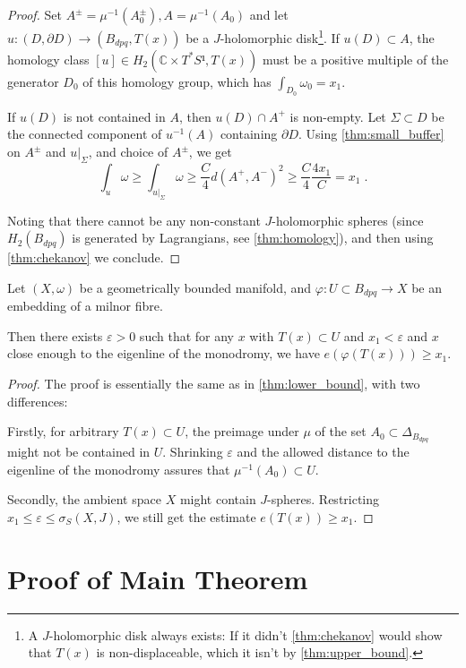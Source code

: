 \documentclass[12pt,a4paper,draft]{scrartcl}
\begin{document}
\begin{proof}
  Set $A^± = μ^{-1}(A_0^±), A = μ^{-1}(A_0)$ and let $u\colon (D,∂D) → (B_{dpq}, T(x))$ be a $J$-holomorphic disk\footnote{A $J$-holomorphic disk always exists: If it didn't \cref{thm:chekanov} would show that $T(x)$ is non-displaceable, which it isn't by \cref{thm:upper_bound}.}. If $u(D) ⊂ A$, the homology class $[u] ∈ H_2(ℂ × T^*S¹, T(x))$ must be a positive multiple of the generator $D_0$ of this homology group, which has $∫_{D_0} ω_0 = x_1$.
  
  If $u(D)$ is not contained in $A$, then $u(D) ∩ A^+$ is non-empty. Let $Σ ⊂ D$ be the connected component of $u^{-1}(A)$ containing $∂D$. Using \cref{thm:small_buffer} on $A^±$ and $u|_Σ$, and choice of $A^±$, we get
  \[∫_u ω ≥ ∫_{u|_Σ} ω ≥ \frac{C}{4} d(A^+,A^-)^2 ≥ \frac{C}{4} \frac{4x_1}{C} = x_1 \;. \]

  Noting that there cannot be any non-constant $J$-holomorphic spheres (since $H_2(B_{dpq})$ is generated by Lagrangians, see \cref{thm:homology}), and then using \cref{thm:chekanov} we conclude.
\end{proof}

\begin{proposition}
  \label{thm:embedded_lower_bound}
  Let $(X,ω)$ be a geometrically bounded manifold, and $φ \colon U ⊂ B_{dpq} → X$ be an embedding of a milnor fibre.

  Then there exists $ε>0$ such that for any $x$ with $T(x) ⊂ U$ and $x_1<ε$ and $x$ close enough to the eigenline of the monodromy, we have $e(φ(T(x))) ≥ x_1$.
\end{proposition}

\begin{proof}
  The proof is essentially the same as in \cref{thm:lower_bound}, with two differences:

  Firstly, for arbitrary $T(x) ⊂ U$, the preimage under $μ$ of the set $A_0 ⊂ Δ_{B_{dpq}}$ might not be contained in $U$.
  Shrinking $ε$ and the allowed distance to the eigenline of the monodromy assures that $μ^{-1}(A_0) ⊂ U$.

  Secondly, the ambient space $X$ might contain $J$-spheres. Restricting $x_1 ≤ ε ≤ σ_S(X,J)$, we still get the estimate $e(T(x)) ≥ x_1$.

\end{proof}




\section{Proof of Main Theorem}
\end{document}
